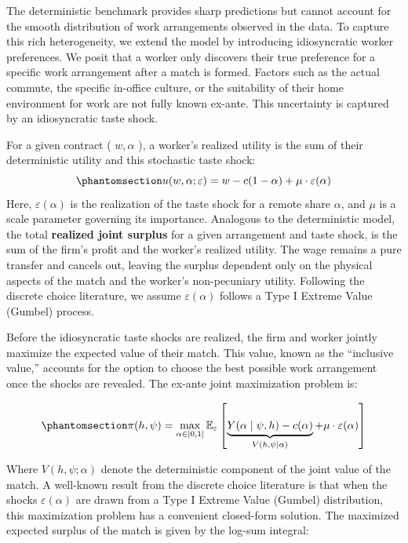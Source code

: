 \documentclass[
  11pt,
  letterpaper,
  DIV=11,
  numbers=noendperiod]{scrartcl}
\begin{document}
The deterministic benchmark provides sharp predictions but cannot
account for the smooth distribution of work arrangements observed in the
data. To capture this rich heterogeneity, we extend the model by
introducing idiosyncratic worker preferences. We posit that a worker
only discovers their true preference for a specific work arrangement
after a match is formed. Factors such as the actual commute, the
specific in-office culture, or the suitability of their home environment
for work are not fully known ex-ante. This uncertainty is captured by an
idiosyncratic taste shock.

For a given contract ( \(w, \alpha\) ), a worker's realized utility is
the sum of their deterministic utility and this stochastic taste shock:
\begin{equation}\phantomsection\label{eq-utility-random}{u(w, \alpha ; \varepsilon)=w-c(1-\alpha)+\mu \cdot \varepsilon(\alpha)}\end{equation}
Here, \(\varepsilon(\alpha)\) is the realization of the taste shock for
a remote share \(\alpha\), and \(\mu\) is a scale parameter governing
its importance. Analogous to the deterministic model, the total
\textbf{realized joint surplus} for a given arrangement and taste shock,
is the sum of the firm's profit and the worker's realized utility. The
wage remains a pure transfer and cancels out, leaving the surplus
dependent only on the physical aspects of the match and the worker's
non-pecuniary utility. Following the discrete choice literature, we
assume \(\varepsilon(\alpha)\) follows a Type I Extreme Value (Gumbel)
process.

Before the idiosyncratic taste shocks are realized, the firm and worker
jointly maximize the expected value of their match. This value, known as
the ``inclusive value,'' accounts for the option to choose the best
possible work arrangement once the shocks are revealed. The ex-ante
joint maximization problem is:

\begin{equation}\phantomsection\label{eq-flow-value-expected}{\pi(h, \psi)  = \max_{\alpha \in [0,1]} \mathbb{E}_{\varepsilon} \left[ \underbrace {Y(\alpha \mid \psi, h) - c(\alpha)}_{V(h, \psi \mid \alpha)} + \mu \cdot \varepsilon(\alpha) \right]}\end{equation}

Where \(V(h, \psi; \alpha)\) denote the deterministic component of the
joint value of the match. A well-known result from the discrete choice
literature is that when the shocks \(\varepsilon(\alpha)\) are drawn
from a Type I Extreme Value (Gumbel) distribution, this maximization
problem has a convenient closed-form solution. The maximized expected
surplus of the match is given by the log-sum integral:
\end{document}
